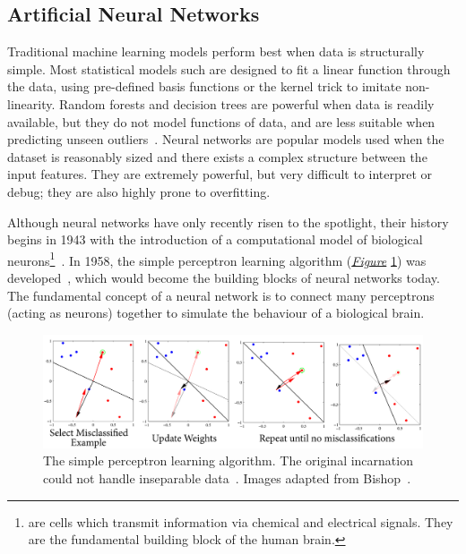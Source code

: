\documentclass[12pt, twoside]{book}
\renewcommand\emph[1]{\textit{\color{USred}{#1}}}
\begin{document}
\subsection{Artificial Neural Networks}

 
Traditional machine learning models perform best when data is structurally simple. Most statistical models such are designed to fit a linear function through the data, using pre-defined basis functions or the kernel trick to imitate non-linearity. Random forests and decision trees are powerful when data is readily available, but they do not model functions of data, and are less suitable when predicting unseen outliers~\cite{kramer2001propositionalization}. Neural networks are popular models used when the dataset is reasonably sized and there exists a complex structure between the input features. They are extremely powerful, but very difficult to interpret or debug; they are also highly prone to overfitting.
 
\label{neuralnetworkintro}Although neural networks have only recently risen to the spotlight, their history begins in 1943 with the introduction of a computational model of biological neurons\footnote{\emph{Neurons} are cells which transmit information via chemical and electrical signals. They are the fundamental building block of the human brain.}~\cite{nn1943}.
In 1958, the simple perceptron learning algorithm (\textit{\hyperref[perceptron]{Figure}} \ref{perceptron}) was developed~\cite{rosenblatt1958perceptron}, which would become the building blocks of neural networks today. The fundamental concept of a neural network is to connect many perceptrons (acting as neurons) together to simulate the behaviour of a biological brain. 



\begin{figure}[!htb]
\centering\includegraphics[width=1\linewidth]{perceptron.png}
\caption{The simple perceptron learning algorithm. The original incarnation could not handle inseparable data~\cite{rosenblatt1958perceptron}. Images adapted from Bishop~\cite{prml}.}
\label{perceptron}
\end{figure}
\end{document}
